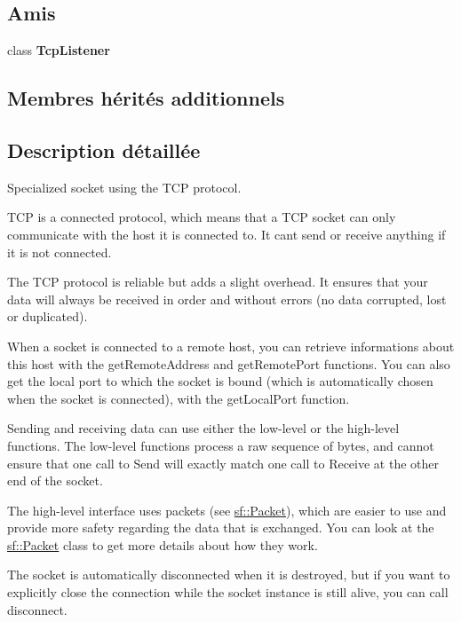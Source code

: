 \subsection*{Amis}
\begin{DoxyCompactItemize}
\item 
\mbox{\label{classsf_1_1TcpSocket_a2b2dd140834917bd44b512236bddea7c}} 
class {\bfseries Tcp\+Listener}
\end{DoxyCompactItemize}
\subsection*{Membres hérités additionnels}


\subsection{Description détaillée}
Specialized socket using the T\+CP protocol. 

T\+CP is a connected protocol, which means that a T\+CP socket can only communicate with the host it is connected to. It can\textquotesingle{}t send or receive anything if it is not connected.

The T\+CP protocol is reliable but adds a slight overhead. It ensures that your data will always be received in order and without errors (no data corrupted, lost or duplicated).

When a socket is connected to a remote host, you can retrieve informations about this host with the get\+Remote\+Address and get\+Remote\+Port functions. You can also get the local port to which the socket is bound (which is automatically chosen when the socket is connected), with the get\+Local\+Port function.

Sending and receiving data can use either the low-\/level or the high-\/level functions. The low-\/level functions process a raw sequence of bytes, and cannot ensure that one call to Send will exactly match one call to Receive at the other end of the socket.

The high-\/level interface uses packets (see \hyperlink{classsf_1_1Packet}{sf\+::\+Packet}), which are easier to use and provide more safety regarding the data that is exchanged. You can look at the \hyperlink{classsf_1_1Packet}{sf\+::\+Packet} class to get more details about how they work.

The socket is automatically disconnected when it is destroyed, but if you want to explicitly close the connection while the socket instance is still alive, you can call disconnect.

